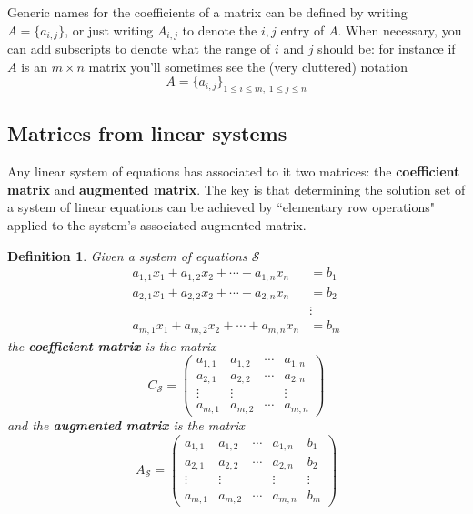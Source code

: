\documentclass[12pt]{article}
\numberwithin{equation}{subsection}
\numberwithin{figure}{subsection}
\newtheorem{defn}[subsection]{Definition}
\theoremstyle{note}
\begin{document}
Generic names for the coefficients of a matrix can be defined by writing $A=\{a_{i,j}\}$, or just writing $A_{i,j}$ to denote the $i,j$ entry of $A$. When necessary, you can add subscripts to denote what the range of $i$ and $j$ should be: for instance if $A$ is an $m\times n$ matrix you'll sometimes see the (very cluttered) notation \[ A=\{a_{i,j}\}_{1\leq i\leq m, \; 1 \leq j \leq n}\]

\subsection{Matrices from linear systems}

Any linear system of equations has associated to it two matrices: the \textbf{coefficient matrix} and \textbf{augmented matrix}. The key is that determining the solution set of a system of linear equations can be achieved by ``elementary row operations" applied to the system's associated augmented matrix. 

\begin{defn} 
Given a system of equations $\mathcal{S}$  \begin{align} 
a_{1,1}x_1+a_{1,2}x_2+\cdots + a_{1,n}x_n&=b_1 \nonumber \\
a_{2,1}x_1+a_{2,2}x_2+\cdots + a_{2,n}x_n&=b_2 \nonumber \\ 
 &\vdots \nonumber  \\
a_{m,1}x_1+a_{m,2}x_2+\cdots + a_{m,n}x_n&=b_m \end{align}
the \textbf{coefficient matrix} is the matrix \begin{equation} C_{\mathcal{S}}=\begin{pmatrix} a_{1,1} & a_{1,2} & \cdots & a_{1,n} \\
a_{2,1} & a_{2,2} & \cdots & a_{2,n} \\
\vdots & \vdots & & \vdots \\
a_{m,1} & a_{m,2} &\cdots & a_{m,n}
\end{pmatrix} \end{equation}
and the \textbf{augmented matrix} is the matrix \begin{equation} A_{\mathcal{S}}=\begin{pmatrix} a_{1,1} & a_{1,2} & \cdots & a_{1,n} & b_1 \\
a_{2,1} & a_{2,2} & \cdots & a_{2,n} & b_2\\
\vdots & \vdots & & \vdots & \vdots \\
a_{m,1} & a_{m,2} &\cdots & a_{m,n} & b_m
\end{pmatrix}\end{equation}
\end{defn}
\end{document}

